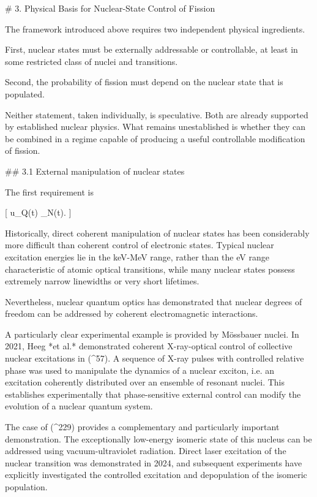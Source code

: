# 3. Physical Basis for Nuclear-State Control of Fission

The framework introduced above requires two independent physical ingredients.

First, nuclear states must be externally addressable or controllable, at least in some restricted class of nuclei and transitions.

Second, the probability of fission must depend on the nuclear state that is populated.

Neither statement, taken individually, is speculative. Both are already supported by established nuclear physics. What remains unestablished is whether they can be combined in a regime capable of producing a useful controllable modification of fission.

## 3.1 External manipulation of nuclear states

The first requirement is

[
u_Q(t)
\longrightarrow
\delta\rho_N(t).
]

Historically, direct coherent manipulation of nuclear states has been considerably more difficult than coherent control of electronic states. Typical nuclear excitation energies lie in the keV-MeV range, rather than the eV range characteristic of atomic optical transitions, while many nuclear states possess extremely narrow linewidths or very short lifetimes.

Nevertheless, nuclear quantum optics has demonstrated that nuclear degrees of freedom can be addressed by coherent electromagnetic interactions.

A particularly clear experimental example is provided by Mössbauer nuclei. In 2021, Heeg *et al.* demonstrated coherent X-ray-optical control of collective nuclear excitations in (^{57}). A sequence of X-ray pulses with controlled relative phase was used to manipulate the dynamics of a nuclear exciton, i.e. an excitation coherently distributed over an ensemble of resonant nuclei. This establishes experimentally that phase-sensitive external control can modify the evolution of a nuclear quantum system.

The case of (^{229}) provides a complementary and particularly important demonstration. The exceptionally low-energy isomeric state of this nucleus can be addressed using vacuum-ultraviolet radiation. Direct laser excitation of the nuclear transition was demonstrated in 2024, and subsequent experiments have explicitly investigated the controlled excitation and depopulation of the isomeric population.

